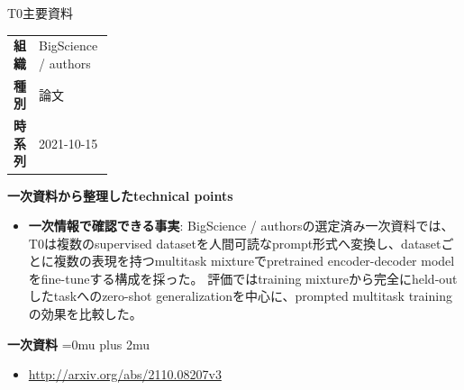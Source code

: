\begin{technicalnote}{T0}{主要資料}
\begingroup
\begin{tabularx}{\linewidth}{@{}>{\bfseries}p{0.22\linewidth}X@{}}
組織 & BigScience / authors \\
種別 & 論文 \\
時系列 & 2021-10-15 \\
\end{tabularx}
\smallskip
{\bfseries 一次資料から整理したtechnical points}
\begin{itemize}[leftmargin=1.5em,itemsep=0.35em]
\item \textbf{一次情報で確認できる事実}: BigScience / authorsの選定済み一次資料では、T0は複数のsupervised datasetを人間可読なprompt形式へ変換し、datasetごとに複数の表現を持つmultitask mixtureでpretrained encoder-decoder modelをfine-tuneする構成を採った。 評価ではtraining mixtureから完全にheld-outしたtaskへのzero-shot generalizationを中心に、prompted multitask trainingの効果を比較した。
\end{itemize}
\begin{minipage}{\linewidth}
\begin{samepage}
{\bfseries 一次資料}
\begingroup\sloppy
\Urlmuskip=0mu plus 2mu\relax
\begin{itemize}[leftmargin=1.5em,itemsep=0.25em]
\item {\scriptsize\url{http://arxiv.org/abs/2110.08207v3}}
\end{itemize}
\endgroup
\end{samepage}
\end{minipage}
\endgroup
\end{technicalnote}
\medskip

